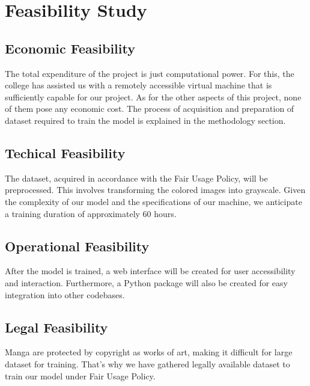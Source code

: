 \section{Feasibility Study}
\subsection{Economic Feasibility}
    The total expenditure of the project is just computational power. For this, the college has assisted us with a remotely accessible virtual machine that is sufficiently capable for our project.  As for the other aspects of this project, none of them pose any economic cost. The process of acquisition and preparation of dataset required to train the model is explained in the methodology section.

\subsection{Techical Feasibility}
    The dataset, acquired in accordance with the Fair Usage Policy, will be preprocessed. This involves transforming the colored images into grayscale. Given the complexity of our model and the specifications of our machine, we anticipate a training duration of approximately 60 hours.

\subsection{Operational Feasibility}
    After the model is trained, a web interface will be created for user accessibility and interaction.  Furthermore, a Python package will also be created for easy integration into other codebases.

\subsection{Legal Feasibility}
    Manga are protected by copyright as works of art, making it difficult for large dataset for training. That’s why we have gathered legally available dataset to train our model under Fair Usage Policy.
    
